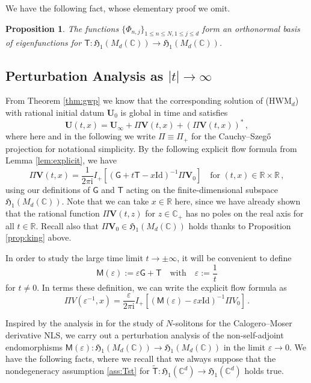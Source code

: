 \documentclass[11pt,reqno]{amsart}
\newtheorem{prop}{Proposition}[section]
\theoremstyle{definition}
\theoremstyle{remark}
\theoremstyle{remark}
\numberwithin{equation}{section}
\newcommand{\Hfr}{\mathfrak{H}}
\newcommand{\C}{\mathbb{C}}
\newcommand{\R}{\mathbb{R}}
\newcommand{\be}{\begin{equation}}
\newcommand{\ee}{\end{equation}}
\newcommand{\eps}{\varepsilon}
\newcommand{\Ms}{\mathsf{M}}
\newcommand{\ii}{\mathrm{i}}
\newcommand{\Vb}{\mathbf{V}}
\newcommand{\Ub}{\mathbf{U}}
\newcommand{\id}{\mathrm{Id}}
\newcommand{\Ts}{\mathsf{T}}
\newcommand{\Tst}{\widetilde{\mathsf{T}}}
\newcommand{\Gs}{\mathsf{G}}
\begin{document}
We have the following fact, whose elementary proof we omit. 
\begin{prop}
The functions $\{ \Phi_{n,j} \}_{1 \leq n \leq N, 1 \leq j \leq d}$ form an orthonormal basis of eigenfunctions for $\Ts : \Hfr_1(M_d(\C)) \to \Hfr_1(M_d(\C))$. 
\end{prop}


\subsection*{Perturbation Analysis as $|t| \to \infty$}

From Theorem \ref{thm:gwp} we know that the corresponding solution of (HWM$_d$) with rational initial datum $\Ub_0$ is global in time and satisfies
\be
\Ub(t,x) = \Ub_\infty + \Pi \Vb(t,x) + (\Pi \Vb(t,x))^* \, ,
\ee
where here and in the following we write $\Pi \equiv \Pi_+$ for the Cauchy--Szeg\H{o} projection for notational simplicity. By the following explicit flow formula from Lemma \ref{lem:explicit}, we have
\be
\Pi \Vb(t,x) = \frac{1}{2 \pi \ii} I_+ \left [ (\Gs+ t \Ts - x \id)^{-1} \Pi \Vb_0 \right ]  \quad \mbox{for $(t,x) \in \R \times \R$} \, ,
\ee
using our definitions of $\Gs$ and $\Ts$ acting on the finite-dimensional subspace $\Hfr_1(M_d(\C))$. Note that we can take $x \in \R$ here, since we have already shown that the rational function $\Pi \Vb(t,z)$ for $z \in \C_+$ has no poles on the real axis for all $t \in \R$. Recall also that $\Pi \Vb_0 \in \Hfr_1(M_d(\C))$ holds thanks to Proposition \ref{prop:king} above.

In order to study the large time limit $t \to \pm \infty$, it will be convenient to define 
\be
\Ms(\eps) := \eps \Gs + \Ts \quad \mbox{with} \quad \eps := \frac{1}{t} 
\ee
for $t \neq 0$. In terms these definition, we can write the explicit flow formula as  
\be \label{eq:explicit_scat}
\Pi V(\eps^{-1}, x) = \frac{\eps}{2 \pi \ii} I_+ [ (\Ms(\eps)- \eps x \id)^{-1} \Pi V_0 ] \, .
\ee

Inspired by the analysis in \cite{GeLe-24} for the study of $N$-solitons for the Calogero--Moser derivative NLS, we carry out a perturbation analysis of the non-self-adjoint endomorphisms $\Ms(\eps) : \Hfr_1(M_d(\C)) \to \Hfr_1(M_d(\C))$ in the limit $\eps \to 0$. We have the following facts, where we recall that we always suppose that the nondegeneracy assumption \eqref{ass:Tst} for $\Tst : \Hfr_1(\C^d) \to \Hfr_1(\C^d)$ holds true.
\end{document}
